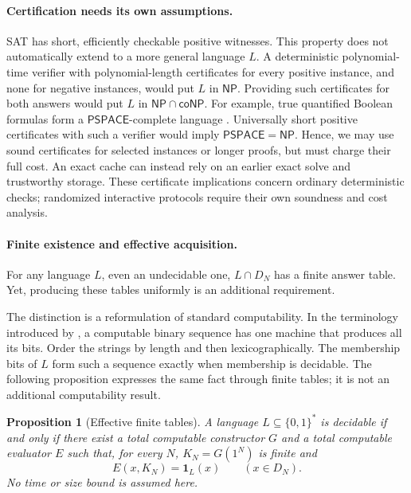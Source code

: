 \documentclass[11pt,a4paper]{article}
\numberwithin{equation}{section}
\newcommand{\NPclass}{\mathsf{NP}}
\newcommand{\coNP}{\mathsf{coNP}}
\newcommand{\bits}{\{0,1\}}
\newcommand{\ind}{\mathbf{1}}
\theoremstyle{plain}
\newtheorem{proposition}[lemma]{Proposition}
\theoremstyle{definition}
\theoremstyle{remark}
\begin{document}
\paragraph{Certification needs its own assumptions.}
SAT has short, efficiently checkable positive witnesses. This property does not automatically extend to a more general language $L$. A deterministic polynomial-time verifier with polynomial-length certificates for every positive instance, and none for negative instances, would put $L$ in $\NPclass$. Providing such certificates for both answers would put $L$ in $\NPclass\cap\coNP$. For example, true quantified Boolean formulas form a $\mathsf{PSPACE}$-complete language \citep{sipser2020theory}. Universally short positive certificates with such a verifier would imply $\mathsf{PSPACE}=\NPclass$. Hence, we may use sound certificates for selected instances or longer proofs, but must charge their full cost. An exact cache can instead rely on an earlier exact solve and trustworthy storage. These certificate implications concern ordinary deterministic checks; randomized interactive protocols require their own soundness and cost analysis.

\paragraph{Finite existence and effective acquisition.}
For any language $L$, even an undecidable one, $L\cap D_N$ has a finite answer table. Yet, producing these tables uniformly is an additional requirement.

The distinction is a reformulation of standard computability. In the terminology introduced by \citet{turing1937computable}, a computable binary sequence has one machine that produces all its bits. Order the strings by length and then lexicographically. The membership bits of $L$ form such a sequence exactly when membership is decidable. The following proposition expresses the same fact through finite tables; it is not an additional computability result.

\begin{proposition}[Effective finite tables]
\label{prop:effective-tables}
A language $L\subseteq\bits^*$ is decidable if and only if there exist a total computable constructor $G$ and a total computable evaluator $E$ such that, for every $N$, $K_N=G(1^N)$ is finite and
\begin{equation}
E(x,K_N)=\ind_L(x)\qquad(x\in D_N).
\label{eq:effective-tables}
\end{equation}
No time or size bound is assumed here.
\end{proposition}
\end{document}
